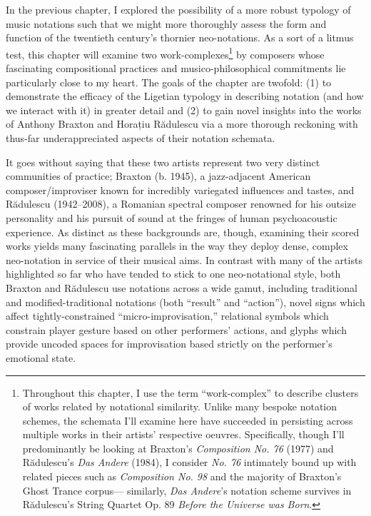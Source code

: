 

    In the previous chapter, I explored the possibility of a more robust typology of music notations such that we might more thoroughly assess the form and function of the twentieth century's thornier neo-notations. As a sort of a litmus test, this chapter will examine two work-complexes\footnote{Throughout this chapter, I use the term ``work-complex'' to describe clusters of works related by notational similarity. Unlike many bespoke notation schemes, the schemata I'll examine here have succeeded in persisting across multiple works in their artists' respective oeuvres. Specifically, though I'll predominantly be looking at Braxton's \textit{Composition No. 76} (1977) and Rădulescu's \textit{Das Andere} (1984), I consider \textit{No. 76} intimately bound up with related pieces such as \textit{Composition No. 98} and the majority of Braxton's Ghost Trance corpus--- similarly, \textit{Das Andere}'s notation scheme survives in Rădulescu's String Quartet Op. 89 \textit{Before the Universe was Born}.} by composers whose fascinating compositional practices and musico-philosophical commitments lie particularly close to my heart. The goals of the chapter are twofold: (1) to demonstrate the efficacy of the Ligetian typology in describing notation (and how we interact with it) in greater detail and (2) to gain novel insights into the works of Anthony Braxton and Horațiu Rădulescu via a more thorough reckoning with thus-far underappreciated aspects of their notation schemata.


    It goes without saying that these two artists represent two very distinct communities of practice; Braxton (b. 1945), a jazz-adjacent American composer/improviser known for incredibly variegated influences and tastes, and Rădulescu (1942--2008), a Romanian spectral composer renowned for his outsize personality and his pursuit of sound at the fringes of human psychoacoustic experience. As distinct as these backgrounds are, though, examining their scored works yields many fascinating parallels in the way they deploy dense, complex neo-notation in service of their musical aims. In contrast with many of the artists highlighted so far who have tended to stick to one neo-notational style, both Braxton and Rădulescu use notations across a wide gamut, including traditional and modified-traditional notations (both ``result'' and ``action''), novel signs which affect tightly-constrained ``micro-improvisation,'' relational symbols which constrain player gesture based on other performers' actions, and glyphs which provide uncoded spaces for improvisation based strictly on the performer's emotional state.

